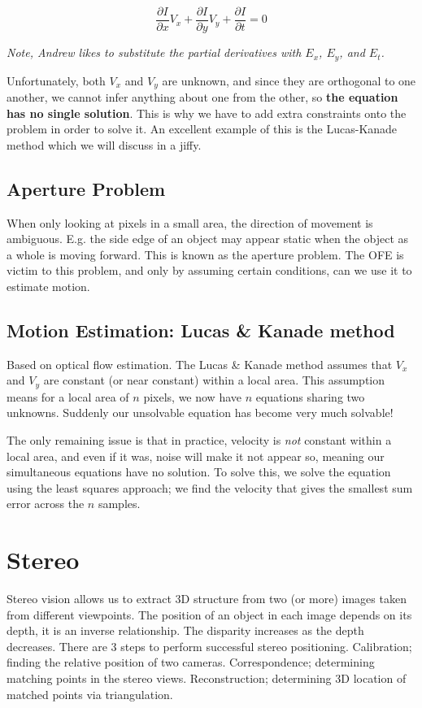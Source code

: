 \documentclass{article}
\begin{document}
        $$ \frac{\partial I}{\partial x}V_x+\frac{\partial I}{\partial y}V_y+\frac{\partial I}{\partial t} = 0 $$
        
        \emph{Note, Andrew likes to substitute the partial derivatives with $E_x$, $E_y$, and $E_t$.}
        
        Unfortunately, both $V_x$ and $V_y$ are unknown, and since they are orthogonal to one another, we cannot infer anything about one from the other, so \textbf{the equation has no single solution}. This is why we have to add extra constraints onto the problem in order to solve it. An excellent example of this is the Lucas-Kanade method which we will discuss in a jiffy.
    
    \subsection{Aperture Problem}
        When only looking at pixels in a small area, the direction of movement is ambiguous. E.g. the side edge of an object may appear static when the object as a whole is moving forward. This is known as the aperture problem. The OFE is victim to this problem, and only by assuming certain conditions, can we use it to estimate motion.
        
    \subsection{Motion Estimation: Lucas \& Kanade method}
        Based on optical flow estimation. The Lucas \& Kanade method assumes that $V_x$ and $V_y$ are constant (or near constant) within a local area. This assumption means for a local area of $n$ pixels, we now have $n$ equations sharing two unknowns. Suddenly our unsolvable equation has become very much solvable!
        
        The only remaining issue is that in practice, velocity is \emph{not} constant within a local area, and even if it was, noise will make it not appear so, meaning our simultaneous equations have no solution. To solve this, we solve the equation using the least squares approach; we find the velocity that gives the smallest sum error across the $n$ samples.
        
\section{Stereo}
    Stereo vision allows us to extract 3D structure from two (or more) images taken from different viewpoints. The position of an object in each image depends on its depth, it is an inverse relationship. The disparity increases as the depth decreases. There are 3 steps to perform successful stereo positioning. Calibration; finding the relative position of two cameras. Correspondence; determining matching points in the stereo views. Reconstruction; determining 3D location of matched points via triangulation.
        
\end{document}
